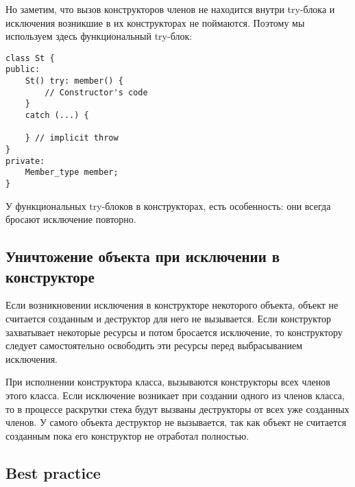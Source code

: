 Но заметим, что вызов конструкторов членов не находится внутри try-блока и исключения возникшие в их конструкторах не поймаются.
Поэтому мы используем здесь функциональный try-блок:

\begin{verbatim}
class St {
public:
    St() try: member() {
        // Constructor's code
    }
    catch (...) {

    } // implicit throw
}
private:
    Member_type member;
}
\end{verbatim}

У функциональных try-блоков в конструкторах, есть особенность: они всегда бросают исключение повторно.

\subsection{Уничтожение объекта при исключении в конструкторе}

Если возникновении исключения в конструкторе некоторого объекта, объект не считается созданным и деструктор для него не вызывается. Если конструктор захватывает некоторые ресурсы и потом бросается исключение, то конструктору следует самостоятельно освободить эти ресурсы перед выбрасыванием исключения.

При исполнении конструктора класса, вызываются конструкторы всех членов этого класса. Если исключение возникает при создании одного из членов класса, то в процессе раскрутки стека будут вызваны деструкторы от всех уже созданных членов. У самого объекта деструктор не вызывается, так как объект не считается созданным пока его конструктор не отработал полностью.

\subsection{Best practice}

